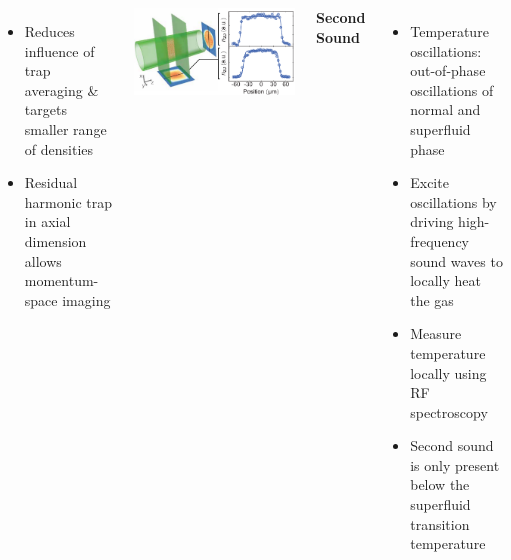 \documentclass[26pt, paperwidth=36in,paperheight=48in]{tikzposter} %
\newcommand{\myfont}{\fontsize{24}{30}\selectfont}
\begin{document}
\begin{columns}
{\begin{minipage}{0.13\textwidth}
\begin{itemize}
		\item Reduces influence of trap averaging \& targets smaller range of densities
		
		\item Residual harmonic trap in axial dimension allows momentum-space imaging
	\end{itemize}
\end{minipage}
\hspace{0.75cm}
\begin{minipage}{0.15\textwidth}
	\centering
	\includegraphics[scale=1.2]{figures/box_cartoon.pdf}
\end{minipage}

} 
	
	
	
	
\block[]{\textcolor{BEC1blue}{Temperature Response -- Second Sound [3]}}
{
\begin{minipage}{0.21\textwidth}
	\vspace{0.5cm}
	\textbf{Second Sound}
	\vspace{1cm}
	\myfont
	\begin{itemize}
		\item Temperature oscillations: out-of-phase oscillations of normal and superfluid phase
		
		
		\item Excite oscillations by driving high-frequency sound waves to locally heat the gas
		
		
		\item Measure temperature locally using RF spectroscopy
		
		
		\item Second sound is only present below the superfluid transition temperature 
		

\end{itemize}
\end{minipage}}
\end{columns}
\end{document}
